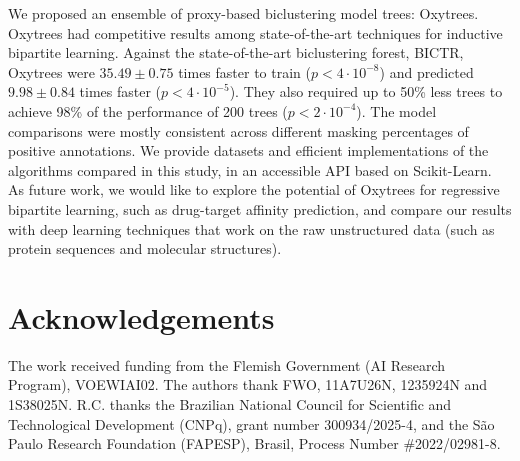 \documentclass[letterpaper]{article}
\begin{document}
We proposed an ensemble of proxy-based biclustering model trees: Oxytrees.
Oxytrees had competitive results among state-of-the-art techniques for inductive bipartite learning.
Against the state-of-the-art biclustering forest, BICTR, Oxytrees were $35.49 \pm 0.75$ times faster to train ($p < 4 \cdot 10^{-8}$) and predicted $9.98 \pm 0.84$ times faster ($p < 4 \cdot 10^{-5}$). They also required up to 50\% less trees to achieve 98\% of the performance of 200 trees ($p < 2 \cdot 10^{-4}$).
The model comparisons were mostly consistent across different masking percentages of positive annotations.
We provide datasets and efficient implementations of the algorithms compared in this study, in an accessible API based on Scikit-Learn.
As future work, we would like to explore the potential of Oxytrees for regressive bipartite learning, such as drug-target affinity prediction, and compare our results with deep learning techniques that work on the raw unstructured data (such as protein sequences and molecular structures).

\FloatBarrier

\section*{Acknowledgements}
The work received funding from the Flemish Government (AI Research Program), VOEWIAI02.
The authors thank FWO, 11A7U26N, 1235924N and 1S38025N.
R.C. thanks the Brazilian National Council for Scientific and Technological Development (CNPq), grant number 300934/2025-4, and the São Paulo Research Foundation (FAPESP), Brasil, Process Number \#2022/02981-8.


\vfill
\end{document}
